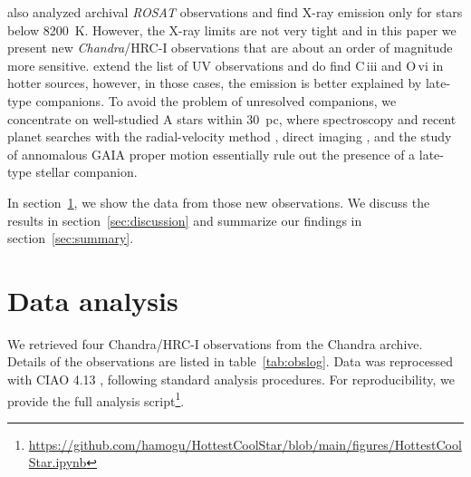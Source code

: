 \documentclass[preprint2]{aastex631}
\begin{document}
\citet{2002ApJ...579..800S} also analyzed archival \emph{ROSAT} observations
and find X-ray emission only for stars below 8200~K. However, the X-ray limits
are not very tight and in this paper we present new \emph{Chandra}/HRC-I observations that are about an order of magnitude more sensitive. \citet{2008ApJ...685..478N} extend the list of UV observations and do find  C\,{\sc iii} and O\,{\sc vi} in hotter sources, however, in those cases, the emission is better explained by late-type companions.
To avoid the problem of unresolved companions, we concentrate on well-studied A stars within 30~pc, where spectroscopy and recent planet searches with the radial-velocity method \citep[e.g.][]{2021AJ....161..157H}, direct imaging \citep[e.g.][]{2013ApJ...776....4N,2017AJ....154..245M}, and the study of annomalous GAIA proper motion \citep{2019A&A...623A..72K} essentially rule out the presence of a late-type stellar companion.

In section~\ref{sec:data}, we show the data from those new observations. We discuss the results in section~\ref{sec:discussion} and summarize our findings in section~\ref{sec:summary}.


\section{Data analysis} \label{sec:data}
We retrieved four Chandra/HRC-I observations from the Chandra archive. Details of the observations are listed in table~\ref{tab:obslog}. Data was reprocessed with CIAO 4.13 \citep{2006SPIE.6270E..1VF}, following standard analysis procedures.
For reproducibility, we provide the full analysis script\footnote{\url{https://github.com/hamogu/HottestCoolStar/blob/main/figures/HottestCoolStar.ipynb}}.
\end{document}
